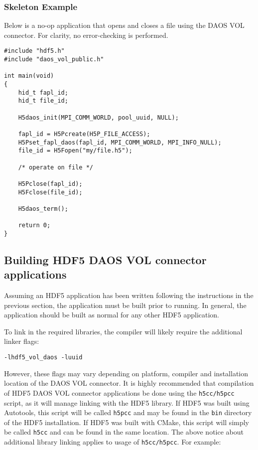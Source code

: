 \newpage

\subsubsection{Skeleton Example}

Below is a no-op application that opens and closes a file using the DAOS VOL connector. For clarity, no error-checking is performed.

\begin{verbatim}
#include "hdf5.h"
#include "daos_vol_public.h"

int main(void)
{
    hid_t fapl_id;
    hid_t file_id;

    H5daos_init(MPI_COMM_WORLD, pool_uuid, NULL);

    fapl_id = H5Pcreate(H5P_FILE_ACCESS);
    H5Pset_fapl_daos(fapl_id, MPI_COMM_WORLD, MPI_INFO_NULL);
    file_id = H5Fopen("my/file.h5");

    /* operate on file */

    H5Pclose(fapl_id);
    H5Fclose(file_id);

    H5daos_term();

    return 0;
}
\end{verbatim}

\newpage

\subsection{Building HDF5 DAOS VOL connector applications}

Assuming an HDF5 application has been written following the instructions in the previous section, the application must be built prior to running. In general, the application should be built as normal for any other HDF5 application.

To link in the required libraries, the compiler will likely require the additional linker flags:

\begin{verbatim}
-lhdf5_vol_daos -luuid
\end{verbatim}

However, these flags may vary depending on platform, compiler and installation location of the DAOS VOL connector. It is highly recommended that compilation of HDF5 DAOS VOL connector applications be done using the \texttt{h5cc/h5pcc} script, as it will manage linking with the HDF5 library. If HDF5 was built using Autotools, this script will be called \texttt{h5pcc} and may be found in the \texttt{bin} directory of the HDF5 installation. If HDF5 was built with CMake, this script will simply be called \texttt{h5cc} and can be found in the same location. The above notice about additional library linking applies to usage of \texttt{h5cc/h5pcc}. For example:

